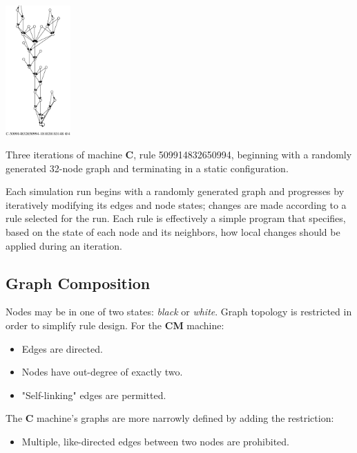 \documentclass{tufte-handout}
\begin{document}
\begin{marginfigure}
\hspace{3em}
\includegraphics[width=2.5cm]{evol2a_4.ps}
\caption{Three iterations of machine \textbf{C}, rule 509914832650994,
beginning with a randomly generated 32-node graph and terminating in a
static configuration.}
\end{marginfigure}

Each simulation run begins with a randomly generated graph and progresses by
iteratively modifying its edges and node states; changes are made according to a rule selected
for the run. Each rule is effectively a simple program  that specifies, based on the state
of each node and its neighbors, how local changes should be applied during an
iteration.

\subsection{Graph Composition}

Nodes may be in one of two states: \textit{black} or \textit{white}.
Graph topology is restricted in order to simplify rule design. For the
\textbf{CM} machine:

\vspace{1mm}
\begin{itemize}
\setlength{\itemindent}{2em}
    \item Edges are directed.
    \item Nodes have out-degree of exactly two.
    \item "Self-linking" edges are permitted.
\end{itemize}
\vspace{2mm}
The \textbf{C}  machine's graphs are more narrowly defined by adding the
restriction:
\begin{itemize} 
\setlength{\itemindent}{2em}
    \item Multiple, like-directed edges between two nodes are prohibited.
\end{itemize}
\vspace{2mm}
\end{document}
